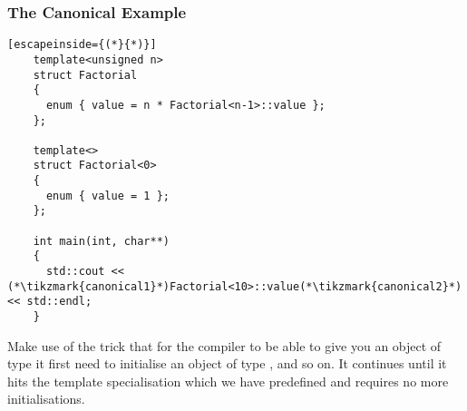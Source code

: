 \documentclass[11pt,a4paper,dvipsnames,usenames]{beamer}
\begin{document}
\begin{frame}[fragile]
  \frametitle{The Canonical Example}
 
  \begin{lstlisting}[escapeinside={(*}{*)}]
    template<unsigned n>
    struct Factorial
    {
      enum { value = n * Factorial<n-1>::value };
    };

    template<>
    struct Factorial<0>
    {
      enum { value = 1 };
    };

    int main(int, char**)
    {
      std::cout << (*\tikzmark{canonical1}*)Factorial<10>::value(*\tikzmark{canonical2}*) << std::endl;
    }
  \end{lstlisting}


  {
    Make use of the trick that for the compiler to be able to give you an object of type  it
    first need to initialise an object of type , and so on. It continues until it hits the
    template specialisation  which we have predefined and requires no more initialisations.
  }

\end{frame}
\end{document}

